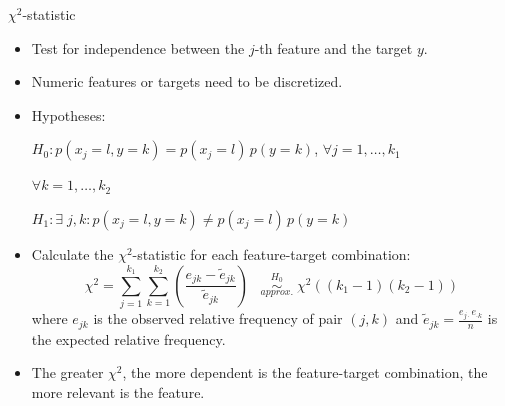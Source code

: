 \documentclass[11pt,compress,t,notes=noshow, xcolor=table]{beamer}
\begin{document}



  \begin{vbframe}{$\chi^2$-statistic}
  \begin{itemize}
    \item Test for independence between the $j$-th feature and the target $y$.
    \item Numeric features or targets need to be discretized.
    \item Hypotheses:

    $H_0: p(x_j = l, y = k) = p(x_j = l)\, p(y = k)$, $\forall j = 1, \dots, k_1$

    \noindent\hspace*{6.55cm} $\forall k = 1, \dots, k_2$

    $H_1: \exists \; j, k: p(x_j = l, y = k) \neq p(x_j = l)\, p(y = k)$
    \item Calculate the $\chi^2$-statistic for each feature-target combination:
      $$ \chi^2 = \sum_{j = 1}^{k_1} \sum_{k=1}^{k_2} (\frac{e_{jk} - \tilde{e}_{jk}}{\tilde{e}_{jk}}) \;\;\;   \stackrel{H_0}{\underset{approx.}{\sim}} \; \chi^2 ((k_1-1)(k_2-1))$$
    where $e_{jk}$ is the observed relative frequency of pair $(j,k)$ and $\tilde{e}_{jk} = \frac{e_{j \cdot} e_{\cdot k}}{n}$ is the expected relative frequency.
    \item The greater $\chi^2$, the more dependent is the feature-target combination, the more relevant is the feature.
  \end{itemize}
  \end{vbframe}
\end{document}

